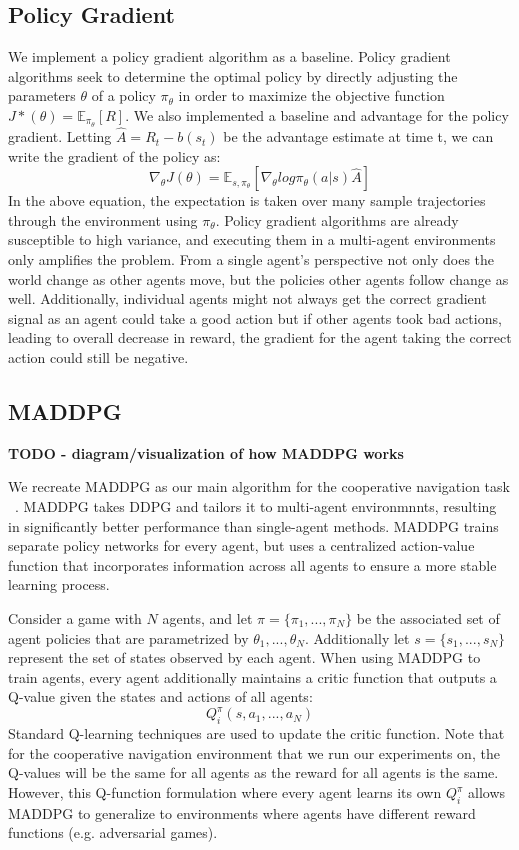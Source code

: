\documentclass{article}
\begin{document}
\subsection{Policy Gradient}
We implement a policy gradient algorithm as a baseline. Policy gradient algorithms seek to determine the optimal policy by directly adjusting the parameters $\theta$ of a policy $\pi_\theta$ in order to maximize the objective function $J*(\theta) = \mathbb{E}_{\pi_\theta}[R]$. We also implemented a baseline and advantage for the policy gradient. Letting $\hat{A} = R_t - b(s_t)$ be the advantage estimate at time t, we can write the gradient of the policy as:
$$\nabla_\theta J(\theta) = \mathbb{E}_{s,\pi_\theta}[\nabla_\theta log \pi_\theta(a|s)\hat{A}]$$
In the above equation, the expectation is taken over many sample trajectories through the environment using $\pi_\theta$. Policy gradient algorithms are already susceptible to  high variance, and executing them in a multi-agent environments only amplifies the problem. From a single agent's perspective not only does the world change as other agents move, but the policies other agents follow change as well. Additionally, individual agents might not always get the correct gradient signal as an agent could take a good action but if other agents took bad actions, leading to overall decrease in reward, the gradient for the agent taking the correct action could still be negative.

\subsection{MADDPG}
\textbf{TODO - diagram/visualization of how MADDPG works}

We recreate MADDPG as our main algorithm for the cooperative navigation task ~\cite{maddpg}.  MADDPG takes DDPG and tailors it to multi-agent environmnnts, resulting in significantly better performance than single-agent methods. MADDPG trains separate policy networks for every agent, but uses a centralized action-value function that incorporates information across all agents to ensure a more stable learning process. 

Consider a game with $N$ agents, and let $\pi = \{\pi_1, ..., \pi_N\}$ be the associated set of agent policies that are parametrized by $\theta_1, ..., \theta_N$. Additionally let $s = \{s_1, ..., s_N\}$ represent the set of states observed by each agent. When using MADDPG to train agents, every agent additionally maintains a critic function that outputs a Q-value given the states and actions of all agents:
$$Q^\pi_i(s, a_1, ..., a_N)$$
Standard Q-learning techniques are used to update the critic function. Note that for the cooperative navigation environment that we run our experiments on, the Q-values will be the same for all agents as the reward for all agents is the same. However, this Q-function formulation where every agent learns its own $Q^\pi_i$ allows MADDPG to generalize to environments where agents have different reward functions (e.g. adversarial games).
\end{document}
